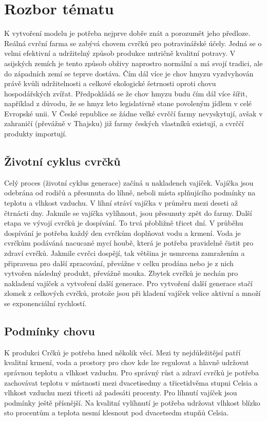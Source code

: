 \documentclass[a4paper, 12pt]{article}
\begin{document}
\section{Rozbor tématu}
K vytvoření modelu je potřeba nejprve dobře znát a porozumět jeho předloze. Reálná cvrční farma se zabývá chovem cvrčků pro potravinářské účely. Jedná se o velmi efektivní a udržitelný způsob produkce nutričně kvalitní potravy. V asijských zemích je tento způsob obživy naprostro normální a má svojí tradici, ale do západních zemí se teprve dostáva. Čím dál více je chov hmyzu vyzdvyhován právě kvůli udržitelnosti a celkové ekologické šetrnosti oproti chovu hospodářských zvířat. Předpokládá se že chov hmyzu budu čím dál více šířit, například z důvodu, že se hmyz leto legislativně stane povoleným jídlem v celé Evropské unii. V České republice se žádne velké cvrččí farmy nevyskytují, avšak v zahraničí (převážně v Thajsku) již farmy českých vlastníků existují, a cvrččí produkty importují. 

\subsection{Životní cyklus cvrčků} \label{cyklus} 
Celý proces (životní cyklus generace) začíná u nakladench vajíček. Vajíčka jsou odebrána od rodičů a přesunuta do líhně, neboli místa splňujícího podmínky na teplotu a vlhkost vzduchu. V líhní stráví vajíčka v průměru mezi deseti až čtrnácti dny. Jakmile se vajíčka vylíhnout, jsou přesunuty zpět do farmy. Další etapa ve vývojí cvrčků je dospívání. To trvá přobližně třicet dní. V průběhu dospívání je potřeba každý den cvrčkům doplňovat vodu a krmení. Voda je cvrčkům podáváná nacucané mycí houbě, která je potřeba pravidelně čistit pro zdraví cvrčků. Jakmile cvrčci dospějí, tak většina je usmrcena zamražením a  připravena pro další zpracování, převážne v celku prodána nebo je z nich vytvořen následný produkt, převážně mouka. Zbytek cvrčků je nechán pro nakladení vajíček a vytvoření další generace. Pro vytvoření další generace stačí zlomek z celkových cvrčků, protože jsou při kladení vajíček velice aktivní a množí se exponenciální rychlostí. 

\subsection{Podmínky chovu}
K produkci Crčků je potřeba hned několik věcí. Mezi ty nejdůležitějsí patří kvalitní krmení, voda a prostory pro chov kde lze regulovat a hlavně udržovat správnou teplotu a vlhkost vzduchu. Pro správný růst a zdraví cvrčků je potřeba zachovávat teplotu v místnosti mezi dvacetisedmy a třicetidvěma stupni Celsia a vlhkost vzduchu mezi třiceti až padesáti procenty. Pro líhnutí vajíček jsou podmínky ještě přísnější. Na kvalitní vylíhnutí je potřeba udržovat vlhkost blízko sto procentům a teplota nesmí klesnout pod dvacetsedm stupňů Celsia.
\end{document}
